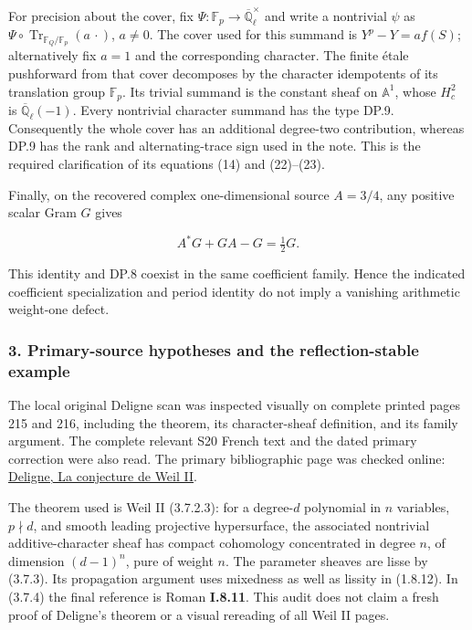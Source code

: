 For precision about the cover, fix \(\Psi:\mathbb F_p\to\overline{\mathbb Q}_{\ell}^{\times}\) and write a nontrivial \(\psi\) as \(\Psi\circ\operatorname{Tr}_{\mathbb F_Q/\mathbb F_p}(a\,\cdot)\), \(a\ne0\). The cover used for this summand is \(Y^p-Y=a f(S)\); alternatively fix \(a=1\) and the corresponding character. The finite étale pushforward from that cover decomposes by the character idempotents of its translation group \(\mathbb F_p\). Its trivial summand is the constant sheaf on \(\mathbb A^1\), whose \(H_c^2\) is \(\overline{\mathbb Q}_{\ell}(-1)\). Every nontrivial character summand has the type DP.9. Consequently the whole cover has an additional degree-two contribution, whereas DP.9 has the rank and alternating-trace sign used in the note. This is the required clarification of its equations (14) and (22)--(23).

Finally, on the recovered complex one-dimensional source \(A=3/4\), any positive scalar Gram \(G\) gives

\[
A^*G+GA-G=\tfrac12G.
\tag{DP.10}
\]

This identity and DP.8 coexist in the same coefficient family. Hence the indicated coefficient specialization and period identity do not imply a vanishing arithmetic weight-one defect.

\subsubsection{3. Primary-source hypotheses and the reflection-stable example}\label{endpoint-purity_review--primary-source-hypotheses-and-the-reflection-stable-example}

The local original Deligne scan was inspected visually on complete printed pages 215 and 216, including the theorem, its character-sheaf definition, and its family argument. The complete relevant S20 French text and the dated primary correction were also read. The primary bibliographic page was checked online: \href{https://www.numdam.org/item/PMIHES_1980__52__137_0/}{Deligne, La conjecture de Weil II}.

The theorem used is Weil II (3.7.2.3): for a degree-\(d\) polynomial in \(n\) variables, \(p\nmid d\), and smooth leading projective hypersurface, the associated nontrivial additive-character sheaf has compact cohomology concentrated in degree \(n\), of dimension \((d-1)^n\), pure of weight \(n\). The parameter sheaves are lisse by (3.7.3). Its propagation argument uses mixedness as well as lissity in (1.8.12). In (3.7.4) the final reference is Roman \textbf{I.8.11}. This audit does not claim a fresh proof of Deligne's theorem or a visual rereading of all Weil II pages.

